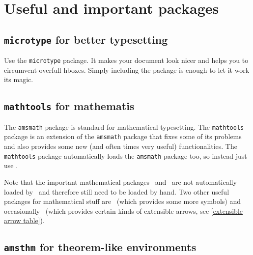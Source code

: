 \chapter{Useful and important packages}




\section{\texttt{microtype} for better typesetting}

Use the \texttt{microtype} package.
It makes your document look nicer and helps you to circumvent overfull hboxes.
Simply including the package is enough to let it work its magic.





\section{\texttt{mathtools} for mathematis}

The \texttt{amsmath} package is standard for mathematical typesetting.
The \texttt{mathtools} package is an extension of the \texttt{amsmath} package that fixes some of its problems and also provides some new (and often times very useful) functionalities.
The \texttt{mathtools} package automatically loads the \texttt{amsmath} package too, so instead  just use .

Note that the important mathematical packages~ and~ are not automatically loaded by~ and therefore still need to be loaded by hand.
Two other useful packages for mathematical stuff are~ (which provides some more symbols) and occasionally~ (which provides certain kinds of extensible arrows, see \cref{extensible arrow table}).





\section{\texttt{amsthm} for theorem-like environments}
\label{defining theorem like environments}

